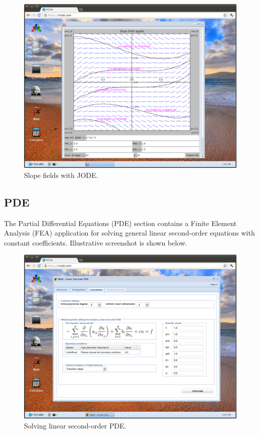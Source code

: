 \documentclass[article,A4,12pt]{llncs}
\begin{document}
\begin{figure}[!ht]
\begin{center}
\includegraphics[width=\textwidth]{img/jode1.png}
\end{center}
\caption{Slope fields with JODE.}
\label{fig:jode1}
\end{figure}


\subsection{PDE}

The Partial Differential Equations (PDE) section contains a Finite Element Analysis (FEA)
application for solving general linear second-order equations with constant coefficients.
Illustrative screenshot is shown below.
\newpage
\begin{figure}[!ht]
\begin{center}
\includegraphics[width=\textwidth]{img/pde1.png}
\end{center}
\caption{Solving linear second-order PDE.}
\label{fig:pde1}
\end{figure}
\end{document}
